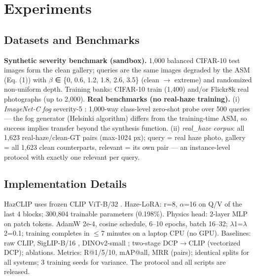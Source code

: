 \documentclass[journal]{IEEEtran}
\begin{document}
\section{Experiments}
\subsection{Datasets and Benchmarks}
\textbf{Synthetic severity benchmark (sandbox).} 1,000 balanced CIFAR-10 test
images form the clean gallery; queries are the same images degraded by the
ASM (Eq. (1)) with $\beta$ ∈ \{0, 0.6, 1.2, 1.8, 2.6, 3.5\} (clean $\rightarrow$ extreme)
and randomized non-uniform depth. Training banks: CIFAR-10 train (1,400)
and/or Flickr8k real photographs (up to 2,000).
\textbf{Real benchmarks (no real-haze training).} (i) \emph{ImageNet-C fog}
severity-5 \cite{hendrycks2019imagenetc}: 1,000-way class-level zero-shot
probe over 500 queries --- the fog generator (Helsinki algorithm) differs
from the training-time ASM, so success implies transfer beyond the
synthesis function. (ii) \emph{real\_haze corpus}: all 1,623 real-haze/clean-GT
pairs (max-1024 px); query = real haze photo, gallery = all 1,623 clean
counterparts, relevant = its own pair --- an instance-level protocol with
exactly one relevant per query.
\subsection{Implementation Details}
HazCLIP uses frozen CLIP ViT-B/32 \cite{radford2021clip}. Haze-LoRA:
r=8, $\alpha$=16 on Q/V of the last 4 blocks; 300,804 trainable parameters
(0.198\%). Physics head: 2-layer MLP on patch tokens. AdamW 2e-4, cosine
schedule, 6--10 epochs, batch 16--32; $\lambda$1=$\lambda$2=0.1; training completes in $\leq$7
minutes on a laptop CPU (no GPU). Baselines: raw CLIP, SigLIP-B/16
\cite{zhai2023siglip}, DINOv2-small \cite{oquab2023dinov2}; two-stage
DCP$\rightarrow$CLIP \cite{he2010dcp} (vectorized DCP); ablations. Metrics: R@1/5/10,
mAP@all, MRR (pairs); identical splits for all systems; 3 training seeds
for variance. The protocol and all scripts are released.
\end{document}
